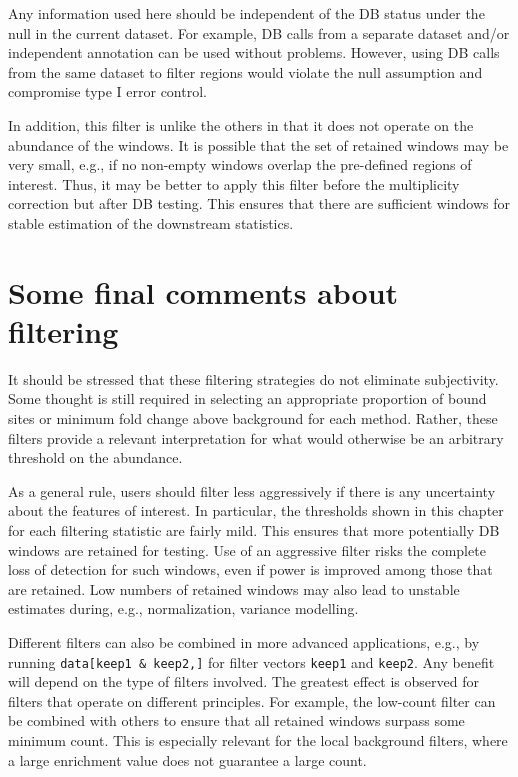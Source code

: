 \documentclass[12pt]{report}
\newcommand{\code}[1]{{\small\texttt{#1}}}
\begin{document}
Any information used here should be independent of the DB status under the null in the current dataset. 
For example, DB calls from a separate dataset and/or independent annotation can be used without problems. 
However, using DB calls from the same dataset to filter regions would violate the null assumption and compromise type I error control.

In addition, this filter is unlike the others in that it does not operate on the abundance of the windows. 
It is possible that the set of retained windows may be very small, e.g., if no non-empty windows overlap the pre-defined regions of interest.
Thus, it may be better to apply this filter before the multiplicity correction but after DB testing.
This ensures that there are sufficient windows for stable estimation of the downstream statistics.

\section{Some final comments about filtering}
It should be stressed that these filtering strategies do not eliminate subjectivity.
Some thought is still required in selecting an appropriate proportion of bound sites or minimum fold change above background for each method.
Rather, these filters provide a relevant interpretation for what would otherwise be an arbitrary threshold on the abundance.

As a general rule, users should filter less aggressively if there is any uncertainty about the features of interest.
In particular, the thresholds shown in this chapter for each filtering statistic are fairly mild.
This ensures that more potentially DB windows are retained for testing.
Use of an aggressive filter risks the complete loss of detection for such windows, even if power is improved among those that are retained.
Low numbers of retained windows may also lead to unstable estimates during, e.g., normalization, variance modelling.

Different filters can also be combined in more advanced applications, e.g., by running \code{data[keep1 \& keep2,]} for filter vectors \code{keep1} and \code{keep2}.
Any benefit will depend on the type of filters involved.
The greatest effect is observed for filters that operate on different principles.
For example, the low-count filter can be combined with others to ensure that all retained windows surpass some minimum count.
This is especially relevant for the local background filters, where a large enrichment value does not guarantee a large count.
\end{document}
